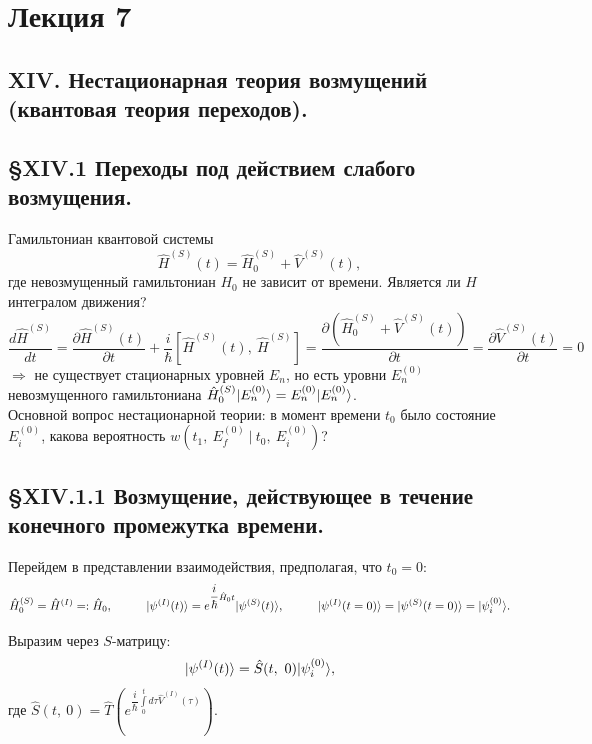 \section{Лекция 7}
\subsection{XIV. Нестационарная теория возмущений (квантовая теория переходов).}
\subsection{\S XIV.1 Переходы под действием слабого возмущения.}
Гамильтониан квантовой системы
\[
\hat{H}^{(S)}(t) = \hat{H}_0^{(S)} + \hat{V}^{(S)}(t),
\]
где невозмущенный гамильтониан $H_0$ не зависит от времени. Является ли $H$ интегралом движения?
\[
\dfrac{d\hat{H}^{(S)}}{dt} = \dfrac{\partial\hat{H}^{(S)}(t)}{\partial t} + \dfrac{i}{\hbar}\left[\hat{H}^{(S)}(t),~\hat{H}^{(S)}\right] = \dfrac{\partial(\hat{H}_0^{(S)} + \hat{V}^{(S)}(t))}{\partial t} = \dfrac{\partial\hat{V}^{(S)}(t)}{\partial t} = 0
\]
$\Longrightarrow$ не существует стационарных уровней $E_n$, но есть уровни $E_n^{(0)}$ невозмущенного гамильтониана $\hat{H}_0^{(S)}| E_n^{(0)} \rangle = E_n^{(0)}| E_n^{(0)} \rangle$.\\

Основной вопрос нестационарной теории: в момент времени $t_0$ было состояние $E_i^{(0)}$, какова вероятность $w\left(t_1,~ E_f^{(0)}~|~t_0,~E_i^{(0)}\right)$?





\subsection{\S XIV.1.1 Возмущение, действующее в течение конечного промежутка времени.}
Перейдем в представлении взаимодействия, предполагая, что $t_0 = 0$:
\[
\hat{H}_0^{(S)} = \hat{H}^{(I)} =: \hat{H}_0,\hspace*{1cm} | \psi^{(I)}(t) \rangle = e^{\dfrac{i}{\hbar}\hat{H}_0t}| \psi^{(S)}(t) \rangle, \hspace*{1cm} | \psi^{(I)}(t = 0) \rangle = | \psi^{(S)}(t = 0) \rangle = | \psi_i^{(0)} \rangle.
\]

Выразим через $S$-матрицу:
\[
| \psi^{(I)}(t) \rangle = \hat{S}(t,~0)| \psi_i^{(0)} \rangle,
\]
где $\hat{S}(t,~0) = \hat{T}\left(e^{\dfrac{i}{\hbar} \int\limits_0^t d\tau \hat{V}^{(I)}(\tau)}\right)$.\\

